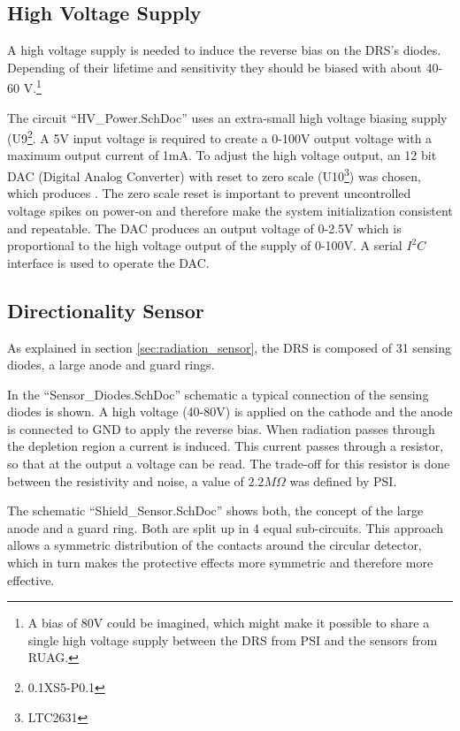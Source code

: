 \subsection{High Voltage Supply}
\label{sec:hv_supply}
A high voltage supply is needed to induce the reverse bias on the DRS's diodes.
Depending of their lifetime and sensitivity they should be biased with about 40-60 V.\footnote{A bias of 80V could be imagined, which might make it possible to share a single high voltage supply between the DRS from PSI and the sensors from RUAG.} 

The circuit ``HV\_Power.SchDoc'' uses an extra-small high voltage biasing supply (U9\footnote{0.1XS5-P0.1}.
A 5V input voltage is required to create a 0-100V output voltage with a maximum output current of 1mA.
To adjust the high voltage output, an 12 bit DAC (Digital Analog Converter) with reset to zero scale (U10\footnote{LTC2631}) was chosen, which produces .
The zero scale reset is important to prevent uncontrolled voltage spikes on power-on and therefore make the system initialization consistent and repeatable.
The DAC produces an output voltage of 0-2.5V which is proportional to the high voltage output of the supply of 0-100V.
A serial $I^2C$ interface is used to operate the DAC.


\subsection{Directionality Sensor}
\label{sec:directionality Sensor}
As explained in section \ref{sec:radiation_sensor}, the DRS is composed of 31 sensing diodes, a large anode and guard rings.

In the ``Sensor\_Diodes.SchDoc'' schematic a typical connection of the sensing diodes is shown.
A high voltage (40-80V) is applied on the cathode and the anode is connected to GND to apply the reverse bias.
When radiation passes through the depletion region a current is induced.
This current passes through a resistor, so that at the output a voltage can be read.
The trade-off for this resistor is done between the resistivity and noise, a value of $2.2M\Omega$ was defined by PSI.

The schematic ``Shield\_Sensor.SchDoc'' shows both, the concept of the large anode and a guard ring.
Both are split up in 4 equal sub-circuits.
This approach allows a symmetric distribution of the contacts around the circular detector, which in turn makes the protective effects more symmetric and therefore more effective. 

